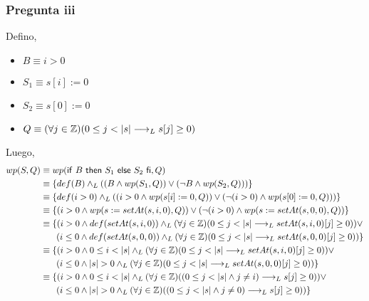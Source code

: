 \subsubsection{Pregunta iii}
Defino,
\begin{itemize}
    \item $ B \equiv i > 0 $
    \item $ S_1 \equiv s[i] := 0 $
    \item $ S_2 \equiv s[0] := 0 $
    \item $ Q \equiv (\forall j \in \mathbb{Z})(0 \leq j < |s| \longrightarrow _L s[j] \geq 0) $
\end{itemize}
Luego,
\begin{align*}
    wp(S, Q) &\equiv wp(\mathsf{if}\ B\ \mathsf{then}\ S_1\ \mathsf{else}\ S_2\ \mathsf{fi}, Q) \\
    &\equiv \{ def(B) \land _L ((B \wedge wp(S_1, Q)) \vee (\neg B \wedge wp(S_2, Q))) \} \\
    &\equiv \{ def(i > 0) \land _L ((i > 0 \wedge wp(s[i] := 0, Q)) \vee (\neg (i > 0) \wedge wp(s[0] := 0, Q))) \} \\
    &\equiv \{(i > 0 \wedge wp(s:=setAt(s, i, 0), Q)) \vee (\neg (i > 0) \wedge wp(s:=setAt(s, 0, 0), Q)) \} \\
    &\equiv \{(i > 0 \wedge def(setAt(s, i, 0)) \land _L (\forall j \in \mathbb{Z})(0 \leq j < |s| \longrightarrow _L setAt(s, i, 0)[j] \geq 0)) \vee \\
    &\quad \; \; \: (i \leq 0 \wedge def(setAt(s, 0, 0)) \land _L (\forall j \in \mathbb{Z})(0 \leq j < |s| \longrightarrow _L setAt(s, 0, 0)[j] \geq 0)) \} \\
    &\equiv \{(i > 0 \wedge 0 \leq i < |s| \land _L (\forall j \in \mathbb{Z})(0 \leq j < |s| \longrightarrow _L setAt(s, i, 0)[j] \geq 0)) \vee \\
    &\quad \; \; \: (i \leq 0 \wedge |s| > 0 \land _L (\forall j \in \mathbb{Z})(0 \leq j < |s| \longrightarrow _L setAt(s, 0, 0)[j] \geq 0)) \} \\
    &\equiv \{(i > 0 \wedge 0 \leq i < |s| \land _L (\forall j \in \mathbb{Z})((0 \leq j < |s| \wedge j \neq i) \longrightarrow _L s[j] \geq 0)) \vee \\
    &\quad \; \; \: (i \leq 0 \wedge |s| > 0 \land _L (\forall j \in \mathbb{Z})((0 \leq j < |s| \wedge j \neq 0) \longrightarrow _L s[j] \geq 0)) \} \\
\end{align*}

